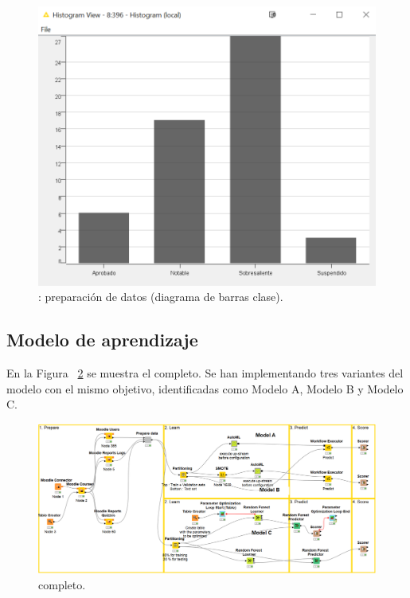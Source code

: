 \begin{figure}[!htb]
	\centering
	\includegraphics[width=1\textwidth]{img/workflow3.png}
	\caption{: preparación de datos (diagrama de barras clase).}
	\label{fig:workflow3}
\end{figure}
\FloatBarrier


\subsection{Modelo de aprendizaje}

En la Figura ~\ref{fig:workflow4} se muestra el  completo. Se han implementando tres variantes del modelo con el mismo 
objetivo, identificadas como Modelo A, Modelo B y Modelo C. 

\begin{figure}[!htb]
	\centering
	\includegraphics[width=1\textwidth]{img/workflow4.png}
	\caption{ completo.}
	\label{fig:workflow4}
\end{figure}
\FloatBarrier

